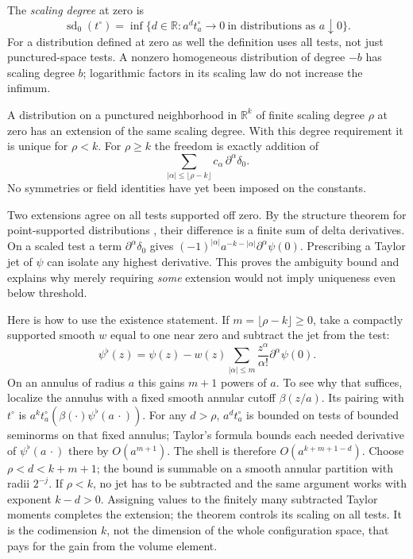 \begin{definition}
The \emph{scaling degree} at zero is
\[
 \operatorname{sd}_0(t^\circ)=\inf\{d\in\mathbb R:
      a^d t^\circ_a\longrightarrow0\ \text{in distributions as }a\downarrow0\}.
\]
For a distribution defined at zero as well the definition uses all tests,
not just punctured-space tests. A nonzero homogeneous distribution of
degree $-b$ has scaling degree $b$; logarithmic factors in its scaling
law do not increase the infimum.
\end{definition}

\begin{theorem}
\label{f:ext-theorem}
A distribution on a punctured neighborhood in $\mathbb R^k$ of finite
scaling degree $\rho$ at zero has an extension of the same scaling degree.
With this degree requirement it is unique for $\rho<k$. For $\rho\ge k$
the freedom is exactly addition of
\begin{equation}
 \sum_{|\alpha|\le\lfloor\rho-k\rfloor}c_\alpha\,\partial^\alpha\delta_0 .
 \label{f:ext-jets}
\end{equation}
No symmetries or field identities have yet been imposed on the constants.
\end{theorem}

Two extensions agree on all tests supported off zero. By the structure
theorem for point-supported distributions \cite{Schwartz,HormI}, their
difference is a finite sum of delta derivatives. On a scaled test a term
$\partial^\alpha\delta_0$ gives
$(-1)^{|\alpha|}a^{-k-|\alpha|}\partial^\alpha\psi(0)$. Prescribing a
Taylor jet of $\psi$ can isolate any highest derivative. This proves the
ambiguity bound and explains why merely requiring \emph{some} extension
would not imply uniqueness even below threshold.

Here is how to use the existence statement. If $m=\lfloor\rho-k\rfloor
\ge0$, take a compactly supported smooth $w$ equal to one near zero and
subtract the jet from the test:
\[
 \psi^\flat(z)=\psi(z)-w(z)\sum_{|\alpha|\le m}
                   \frac{z^\alpha}{\alpha!}\partial^\alpha\psi(0) .
\]
On an annulus of radius $a$ this gains $m+1$ powers of $a$. To see why
that suffices, localize the annulus with a fixed smooth annular cutoff
$\beta(z/a)$. Its pairing with $t^\circ$ is
$a^k t^\circ_a(\beta(\cdot)\psi^\flat(a\,\cdot))$. For any $d>\rho$,
$a^d t^\circ_a$ is bounded on tests of bounded seminorms on that fixed
annulus; Taylor's formula bounds each needed derivative of
$\psi^\flat(a\,\cdot)$ there by $O(a^{m+1})$. The shell is therefore
$O(a^{k+m+1-d})$. Choose $\rho<d<k+m+1$; the bound is summable on a
smooth annular partition with radii $2^{-j}$. If $\rho<k$, no jet has to
be subtracted and the same argument works with exponent $k-d>0$.
Assigning values to the finitely many subtracted Taylor moments completes
the extension; the theorem controls its scaling on all tests. It is the
codimension $k$, not the dimension of the whole configuration space, that
pays for the gain from the volume element.

